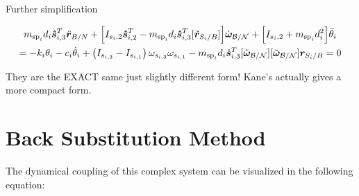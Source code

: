 \documentclass[paper]{aiaaNew}
\begin{document}
Further simplification

\begin{multline}
m_{\text{sp}_i} d_i \bm{\hat{s}}_{i,3}^T \ddot{\bm r}_{B/N} + \Big[I_{s_i,2} \bm{\hat{s}}_{i,2}^T - m_{\text{sp}_i} d_i \bm{\hat{s}}_{i,3}^T [\tilde{\bm{r}}_{S_i/B}] \Big] \dot{\bm\omega}_{\cal B/N} + \Big[I_{s_i,2} + m_{\text{sp}_i} d_i^2 \Big] \ddot{\theta}_i \\
= -k_i \theta_i - c_i \dot{\theta}_i + \left(I_{s_{i,3}} - I_{s_{i,1}} \right) \omega_{s_{i,3}} \omega_{s_{i,1}} - m_{\text{sp}_i} d_i \hat{\bm s}_{i,3}^{T} [\tilde{\bm\omega}_{\cal B/N}][\tilde{\bm\omega}_{\cal B/N}] \bm r_{S_i/B}  = 0
\end{multline}

They are the EXACT same just slightly different form! Kane's actually gives a more compact form.

	\section{Back Substitution Method}
	The dynamical coupling of this complex system can be visualized in the following equation:
	
\end{document}
